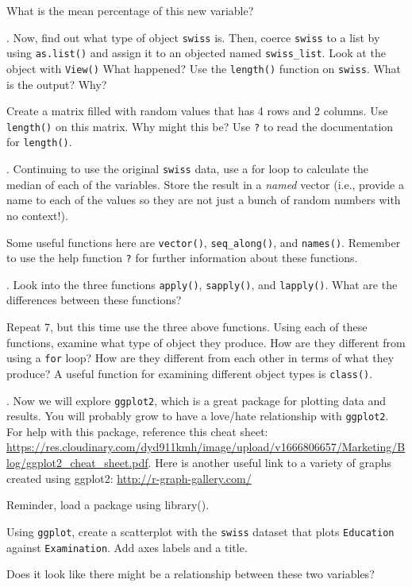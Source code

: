 \documentclass[
]{article}
\begin{document}
What is the mean percentage of this new variable?

. Now, find out what type of object \texttt{swiss} is. Then, coerce
\texttt{swiss} to a list by using \texttt{as.list()} and assign it to an
objected named \texttt{swiss\_list}. Look at the object with
\texttt{View()} What happened? Use the \texttt{length()} function on
\texttt{swiss}. What is the output? Why?

Create a matrix filled with random values that has 4 rows and 2 columns.
Use \texttt{length()} on this matrix. Why might this be? Use \texttt{?}
to read the documentation for \texttt{length()}.

. Continuing to use the original \texttt{swiss} data, use a for loop to
calculate the median of each of the variables. Store the result in a
\emph{named} vector (i.e., provide a name to each of the values so they
are not just a bunch of random numbers with no context!).

Some useful functions here are \texttt{vector()}, \texttt{seq\_along()},
and \texttt{names()}. Remember to use the help function \texttt{?} for
further information about these functions.

. Look into the three functions \texttt{apply()}, \texttt{sapply()},
and \texttt{lapply()}. What are the differences between these functions?

Repeat 7, but this time use the three above functions. Using each of
these functions, examine what type of object they produce. How are they
different from using a \texttt{for} loop? How are they different from
each other in terms of what they produce? A useful function for
examining different object types is \texttt{class()}.

. Now we will explore \texttt{ggplot2}, which is a great package for
plotting data and results. You will probably grow to have a love/hate
relationship with \texttt{ggplot2}. For help with this package,
reference this cheat sheet:
\url{https://res.cloudinary.com/dyd911kmh/image/upload/v1666806657/Marketing/Blog/ggplot2_cheat_sheet.pdf}.
Here is another useful link to a variety of graphs created using
ggplot2: \url{http://r-graph-gallery.com/}

Reminder, load a package using library().

Using \texttt{ggplot}, create a scatterplot with the \texttt{swiss}
dataset that plots \texttt{Education} against \texttt{Examination}. Add
axes labels and a title.

Does it look like there might be a relationship between these two
variables?
\end{document}
